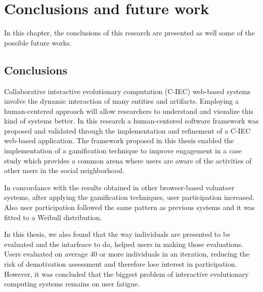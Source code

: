 \chapter{Conclusions and future work} \label{sec:5}

In this chapter, the conclusions of this research are presented as well some of
the possible future works.

\section{Conclusions}

Collaborative interactive evolutionary computation (C-IEC)
web-based systems involve the dynamic interaction of many entities and
artifacts. Employing a human-centered approach will allow researchers to
understand and visualize this kind of systems better. In this research a
human-centered software framework was proposed and validated through the
implementation and refinement of a C-IEC web-based application.
The framework proposed in this thesis enabled the implementation of
a gamification technique to improve engagement in
a case study which provides a common arena where users are aware of the
activities of other users in the social neighborhood.

In concordance with the results obtained in other browser-based volunteer
systems, after applying the gamification techniques, user participation
increased. Also user participation followed the same pattern as previous systems
and it was fitted to a Weibull distribution.

In this thesis, we also found that the way individuals are presented to be
evaluated and the intarfeace to do, helped users in making those evaluations.
Users evaluated on average 40 or more individuals in an iteration,
reducing the risk of demotivation assessment and
therefore lose interest in participation. However, it was concluded that the
biggest problem of interactive evolutionary computing systems remains on user
fatigue.


